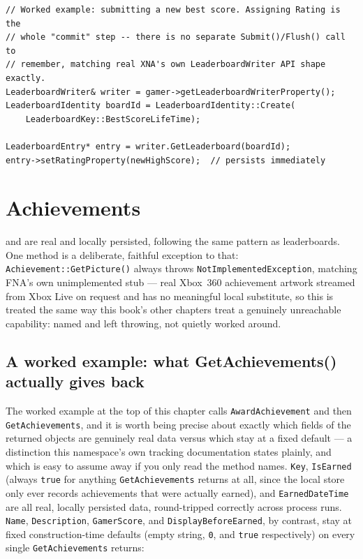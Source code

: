 \begin{lstlisting}
// Worked example: submitting a new best score. Assigning Rating is the
// whole "commit" step -- there is no separate Submit()/Flush() call to
// remember, matching real XNA's own LeaderboardWriter API shape exactly.
LeaderboardWriter& writer = gamer->getLeaderboardWriterProperty();
LeaderboardIdentity boardId = LeaderboardIdentity::Create(
    LeaderboardKey::BestScoreLifeTime);

LeaderboardEntry* entry = writer.GetLeaderboard(boardId);
entry->setRatingProperty(newHighScore);  // persists immediately
\end{lstlisting}

\section{Achievements}

 and  are real and locally persisted,
following the same pattern as leaderboards. One method is a deliberate, faithful exception to
that: \texttt{Achievement::GetPicture()} always throws \texttt{NotImplementedException},
matching FNA's own unimplemented stub --- real Xbox~360 achievement artwork streamed from
Xbox Live on request and has no meaningful local substitute, so this is treated the same way
this book's other chapters treat a genuinely unreachable capability: named and left throwing,
not quietly worked around.

\subsection{A worked example: what GetAchievements() actually gives back}

The worked example at the top of this chapter calls \texttt{AwardAchievement} and then
\texttt{GetAchievements}, and it is worth being precise about exactly which fields of the
returned  objects are genuinely real data versus which stay at a fixed
default --- a distinction this namespace's own tracking documentation states plainly, and
which is easy to assume away if you only read the method names. \texttt{Key},
\texttt{IsEarned} (always \texttt{true} for anything \texttt{GetAchievements} returns at all,
since the local store only ever records achievements that were actually earned), and
\texttt{EarnedDateTime} are all real, locally persisted data, round-tripped correctly across
process runs. \texttt{Name}, \texttt{Description}, \texttt{GamerScore}, and
\texttt{DisplayBeforeEarned}, by contrast, stay at fixed construction-time defaults (empty
string, \texttt{0}, and \texttt{true} respectively) on every single 
\texttt{GetAchievements} returns:

